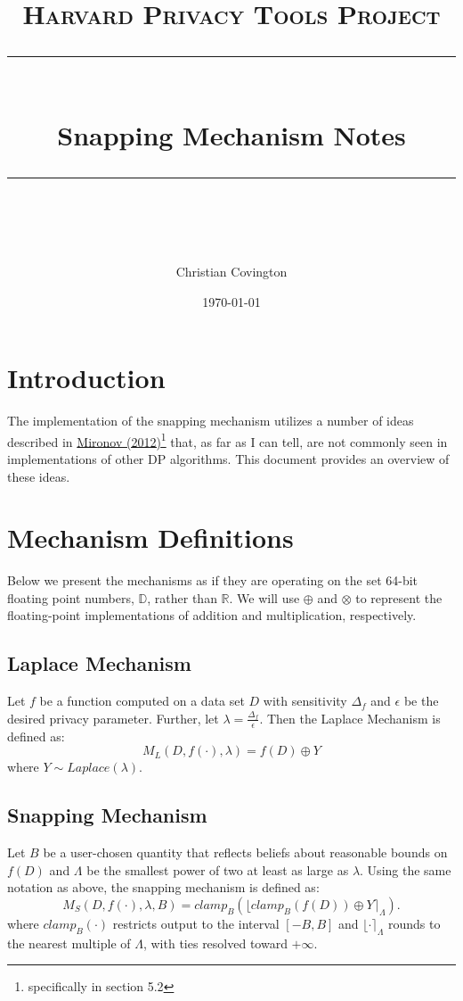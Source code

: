 \documentclass[11pt]{scrartcl} %
\title{
	\normalfont\normalsize
	\textsc{Harvard Privacy Tools Project}\\ %
	\vspace{25pt} %
	\rule{\linewidth}{0.5pt}\\ %
	\vspace{20pt} %
	{\huge Snapping Mechanism Notes}\\ %
	\vspace{12pt} %
	\rule{\linewidth}{2pt}\\ %
	\vspace{12pt} %
}
\author{\LARGE Christian Covington} %
\date{\normalsize\today} %
\begin{document}
\maketitle %

\section{Introduction}
The implementation of the snapping mechanism utilizes a number of ideas described in \href{http://citeseerx.ist.psu.edu/viewdoc/download?doi=10.1.1.366.5957&rep=rep1&type=pdf}{Mironov (2012)}\footnote{specifically in section 5.2} that, as far as I can tell, are not commonly seen in implementations of other DP algorithms. This document provides an overview of these ideas. \newline

\section{Mechanism Definitions}
Below we present the mechanisms as if they are operating on the set 64-bit floating point numbers, $\mathbb{D}$, rather than $\mathbb{R}$. We will use $\oplus$ and $\otimes$ to represent the floating-point implementations of addition and multiplication, respectively.

\subsection{Laplace Mechanism}
\label{subsec:laplace}
Let $f$ be a function computed on a data set $D$ with sensitivity $\Delta_f$ and $\epsilon$ be the desired privacy parameter. Further, let $\lambda = \frac{\Delta_f}{\epsilon}$. Then the Laplace Mechanism is defined as:
\[ M_{L}(D, f(\cdot), \lambda) = f(D) \oplus Y \]
where $Y \sim Laplace(\lambda)$.

\subsection{Snapping Mechanism}
\label{subsec:snapping}
Let $B$ be a user-chosen quantity that reflects beliefs about reasonable bounds on $f(D)$ and $\Lambda$ be the smallest power of two at least as large as $\lambda$. Using the same notation as above, the snapping mechanism is defined as:
\[ M_{S}(D, f(\cdot), \lambda, B) = clamp_{B}\left( \lfloor clamp_{B}\left( f(D) \right) \oplus Y \rceil_{\Lambda} \right). \]
where $clamp_{B}(\cdot)$ restricts output to the interval $[-B, B]$ and $\lfloor \cdot \rceil_{\Lambda}$ rounds to the nearest multiple of $\Lambda$, with ties resolved toward $+ \infty$.
\end{document}
